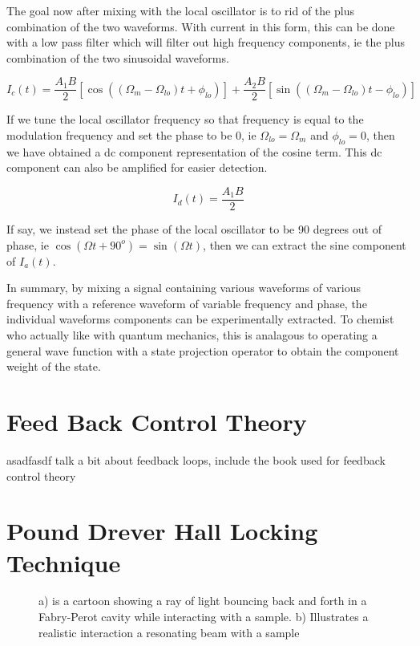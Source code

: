 \documentclass[11pt,a4paper]{book}
\newcommand{\imginput}[1]{} %
\begin{document}
			The goal now after mixing with the local oscillator is to rid of the plus combination of the two waveforms. With current in this form, this can be done with a low pass filter which will filter out high frequency components, ie the plus combination of the two sinusoidal waveforms.
		
			\begin{equation}
				I_c(t) = \dfrac{A_1 B}{2} \left[\cos{\left(\left(\Omega_m-\Omega_{lo} \right)t +\phi_{lo}\right)}\right]
				+\dfrac{A_2 B}{2}\left[\sin{\left(\left(\Omega_m-\Omega_{lo}\right)t-\phi_{lo}\right)}\right]
			\end{equation}					
			
			If we tune the local oscillator frequency so that frequency is equal to the modulation frequency and set the phase to be 0, ie $\Omega_{lo}=\Omega_m$ and $\phi_{lo}=0$, then we have obtained a dc component representation of the cosine term. This dc component can also be amplified for easier detection.
		
			\begin{equation}
				I_d(t) = \dfrac{A_1 B}{2}
			\end{equation}	
		
			If say, we instead set the phase of the local oscillator to be 90 degrees out of phase, ie $\cos(\Omega t + 90^o)=\sin(\Omega t)$, then we can extract the sine component of $I_a(t)$.
			
			In summary, by mixing a signal containing various waveforms of various frequency with a reference waveform of variable frequency and phase, the individual waveforms components can be experimentally extracted. To chemist who actually like with quantum mechanics, this is analagous to operating a general wave function with a state projection operator to obtain the component weight of the state.

	\section{Feed Back Control Theory}
		\label{sec:Feed Back Control Theory}
		asadfasdf talk a bit about feedback loops, include the book used for feedback control theory

	\section{Pound Drever Hall Locking Technique}
		\label{sec:Pound Drever Hall Locking Technique}
		
		\begin{figure} [!ht]
			\centering
			\def\svgwidth{\columnwidth}
			\resizebox{160mm}{!}{\imginput{images/PDH-setup.pdf_tex}}
			\label{fig:PDHSetup}
			\caption{a) is a cartoon showing a ray of light bouncing back and forth in a Fabry-Perot cavity while interacting with a sample. b) Illustrates a realistic interaction a resonating beam with a sample }
		\end{figure}
		
\end{document}
